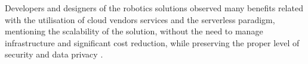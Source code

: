 Developers and designers of the robotics solutions observed many benefits related with the utilisation of cloud vendors services and the serverless paradigm, mentioning the scalability of the solution, without the need to manage infrastructure and significant cost reduction, while preserving the proper level of security and data privacy \cite{AWSIRobotIoT}.






